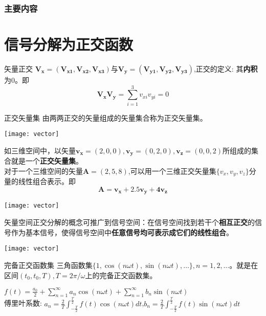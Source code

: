 \begin{frame}
  \frametitle{主要内容}
  \tableofcontents[hideallsubsections]
\end{frame}

\section{信号分解为正交函数}

\begin{frame}
\begin{block}{矢量正交}
	$\bm{V_x=(V_{x1},V_{x2},V_{x3})}$与$\bm{V_y=(V_{y1},V_{y2},V_{y3})}$,正交的定义: 其\textbf{内积}为0。即
	\[\bm{V_xV_y}=\sum_{i=1}^{3}v_{xi}v_{yi}=0 \]
\end{block}
\begin{block}{正交矢量集}
	由两两正交的矢量组成的矢量集合称为正交矢量集。
\end{block}
\texttt{[image: vector]}
\end{frame}

\begin{frame}
\begin{example}
	如三维空间中，以矢量$\bm{v_x}=(2,0,0),\bm{v_y}=(0,2,0),\bm{v_z}=(0,0,2)$所组成的集合就是一个\textbf{正交矢量集}。\\
	对于一个三维空间的矢量$\bm{A}=(2,5,8)$,可以用一个三维正交矢量集$\{v_x,v_y,v_z\}$分量的线性组合表示。即
	\[\bm{A=v_x+2.5v_y+4v_z} \]
\end{example}
\texttt{[image: vector]}
\end{frame}

\begin{frame}
矢量空间正交分解的概念可推广到信号空间：在信号空间找到若干个\textbf{相互正交}的信号作为基本信号，使得信号空间中\textbf{任意信号均可表示成它们的线性组合}。 

\texttt{[image: vector]}
\end{frame}

\begin{frame}{完备正交函数集}
三角函数集$\{1,\cos(n\omega t),\sin(n\omega t),\dots\},n=1,2,\dots$。就是在区间$(t_0,t_0,T),T=2\pi/\omega$上的完备正交函数集。
\begin{example}[傅里叶级数的三角形式]
	$f(t)=\frac{a_0}{2}+\sum\limits_{n=1}^{\infty}a_n\cos(n\omega t)+\sum\limits_{n=1}^{\infty}b_n\sin(n\omega t)$\\
	傅里叶系数: $a_n=\frac{2}{T}\int_{-\frac{T}{2}}^{\frac{T}{2}}f(t)\cos(n\omega t)dt$,\quad $b_n=\frac{2}{T}\int_{-\frac{T}{2}}^{\frac{T}{2}}f(t)\sin(n\omega t)dt$
\end{example}
\end{frame}

